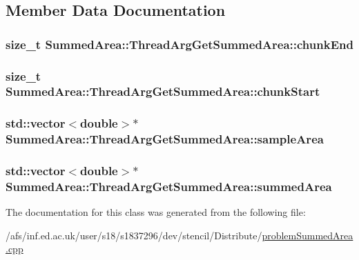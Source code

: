 \subsection{Member Data Documentation}
\hypertarget{classSummedArea_1_1ThreadArgGetSummedArea_a2d54148cc8b8339f10d09788c023c20a}{
\subsubsection[{chunk\-End}]{\setlength{\rightskip}{0pt plus 5cm}size\-\_\-t Summed\-Area\-::\-Thread\-Arg\-Get\-Summed\-Area\-::chunk\-End}}\label{classSummedArea_1_1ThreadArgGetSummedArea_a2d54148cc8b8339f10d09788c023c20a}
\hypertarget{classSummedArea_1_1ThreadArgGetSummedArea_a6b09db7eb9a63d224a6a30ff3ddda5a9}{
\subsubsection[{chunk\-Start}]{\setlength{\rightskip}{0pt plus 5cm}size\-\_\-t Summed\-Area\-::\-Thread\-Arg\-Get\-Summed\-Area\-::chunk\-Start}}\label{classSummedArea_1_1ThreadArgGetSummedArea_a6b09db7eb9a63d224a6a30ff3ddda5a9}
\hypertarget{classSummedArea_1_1ThreadArgGetSummedArea_a259ec50cc8a157c409e607ef0cc985a7}{
\subsubsection[{sample\-Area}]{\setlength{\rightskip}{0pt plus 5cm}std\-::vector$<$double$>$$\ast$ Summed\-Area\-::\-Thread\-Arg\-Get\-Summed\-Area\-::sample\-Area}}\label{classSummedArea_1_1ThreadArgGetSummedArea_a259ec50cc8a157c409e607ef0cc985a7}
\hypertarget{classSummedArea_1_1ThreadArgGetSummedArea_a1d372c5cf76441376dc475005c904ecb}{
\subsubsection[{summed\-Area}]{\setlength{\rightskip}{0pt plus 5cm}std\-::vector$<$double$>$$\ast$ Summed\-Area\-::\-Thread\-Arg\-Get\-Summed\-Area\-::summed\-Area}}\label{classSummedArea_1_1ThreadArgGetSummedArea_a1d372c5cf76441376dc475005c904ecb}


The documentation for this class was generated from the following file\-:\begin{DoxyCompactItemize}
\item 
/afs/inf.\-ed.\-ac.\-uk/user/s18/s1837296/dev/stencil/\-Distribute/\hyperlink{problemSummedArea_8cpp}{problem\-Summed\-Area.\-cpp}\end{DoxyCompactItemize}
